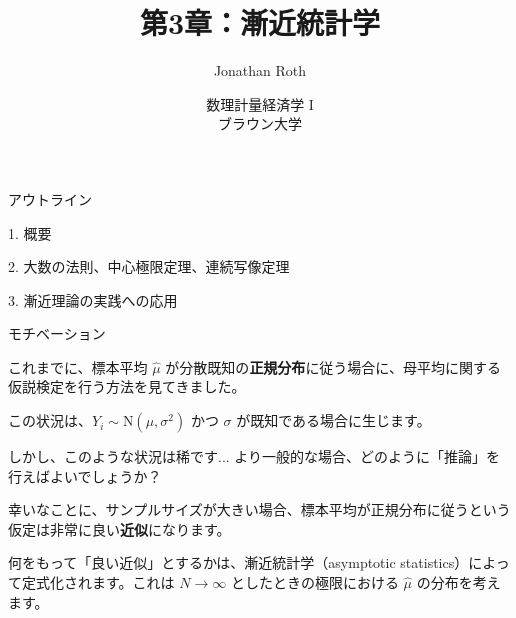 \documentclass[11pt,handout]{beamer}
\newenvironment{wideitemize}{\itemize\addtolength{\itemsep}{10pt}}{\enditemize}
\begin{document}
\begin{frame}[noframenumbering]{}
\vspace{0.5cm}
\title[]{第3章：漸近統計学}
\author{Jonathan Roth}
\date{数理計量経済学 I \\ ブラウン大学\\} 
\titlepage {\small{}\ }\thispagestyle{empty} \vspace{-30pt}

\end{frame}

\begin{frame}{アウトライン}

1. 概要
\vspace{0.8cm}

2. 大数の法則、中心極限定理、連続写像定理
\vspace{0.8cm}

3. 漸近理論の実践への応用

\end{frame}

\begin{frame}{モチベーション}

\begin{wideitemize}
	
\item 
これまでに、標本平均 $\hat\mu$ が分散既知の\textbf{正規分布}に従う場合に、母平均に関する仮説検定を行う方法を見てきました。

\item
この状況は、$Y_i\sim \mathrm{N}(\mu,\sigma^2)$ かつ $\sigma$ が既知である場合に生じます。

\item
しかし、このような状況は稀です... より一般的な場合、どのように「推論」を行えばよいでしょうか？

\pause

\item
幸いなことに、サンプルサイズが大きい場合、標本平均が正規分布に従うという仮定は非常に良い\textbf{近似}になります。

\pause
\item
何をもって「良い近似」とするかは、漸近統計学（asymptotic statistics）によって定式化されます。これは $N \rightarrow \infty$ としたときの極限における $\hat\mu$ の分布を考えます。
	
\end{wideitemize}		

\end{frame}
\end{document}
